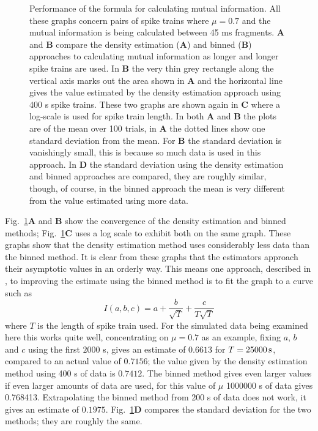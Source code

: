 \documentclass[12pt]{article}
\newcommand{\s}{\mbox{\,s}}
\begin{document}
\begin{figure}[tp]
\begin{center}
\begin{picture}
  \end{picture}%
\endgroup
\end{center}
\caption{Performance of the formula for calculating mutual
  information. All these graphs concern pairs of spike trains where
  $\mu=0.7$ and the mutual information is being calculated between 45
  ms fragments. \textbf{A} and \textbf{B} compare the density
  estimation (\textbf{A}) and binned (\textbf{B}) approaches to
  calculating mutual information as longer and longer spike trains are
  used. In \textbf{B} the very thin grey rectangle along the vertical
  axis marks out the area shown in \textbf{A} and the horizontal line
  gives the value estimated by the density estimation approach using
  400 s spike trains. These two graphs are shown again in \textbf{C}
  where a log-scale is used for spike train length. In both \textbf{A}
  and \textbf{B} the plots are of the mean over 100 trials, in
  \textbf{A} the dotted lines show one standard deviation from the
  mean. For \textbf{B} the standard deviation is vanishingly
  small, this is because so much data is used in this approach. In \textbf{D} the
  standard deviation using the density estimation and binned
  approaches are compared, they are roughly similar, though, of
  course, in the binned approach the mean is very different from the
  value estimated using more data.
 \label{fig_length_sweep}}
\end{figure}


Fig.~\ref{fig_length_sweep}\textbf{A} and \textbf{B} show the
convergence of the density estimation and binned methods;
Fig.~\ref{fig_length_sweep}\textbf{C} uses a log scale to exhibit both
on the same graph. These graphs show that the density estimation
method uses considerably less data than the binned method. It is clear
from these graphs that the estimators approach their asymptotic values
in an orderly way. This means one approach, described in
\cite{TrevesPanzeri1995,StrongEtAl1998,PanzeriEtAl2007}, to improving
the estimate using the binned method is to fit the graph to a curve
such as
\begin{equation}
I(a,b,c)=a+\frac{b}{\sqrt{T}}+\frac{c}{T\sqrt{T}}
\end{equation}
where $T$ is the length of spike train used. For the simulated data
being examined here this works quite well, concentrating on $\mu=0.7$
as an example, fixing $a$, $b$ and $c$ using the first $2000$ s, gives
an estimate of $0.6613$ for $T=25000\s$, compared to an actual value
of $0.7156$; the value given by the density estimation method using
400 s of data is $0.7412$. The binned method gives even larger values
if even larger amounts of data are used, for this value of $\mu$
1000000 s of data gives 0.768413. Extrapolating the binned method from
200 s of data does not work, it gives an estimate of
$0.1975$. Fig.~\ref{fig_length_sweep}\textbf{D} compares the standard
deviation for the two methods; they are roughly the same. 
\end{document}
